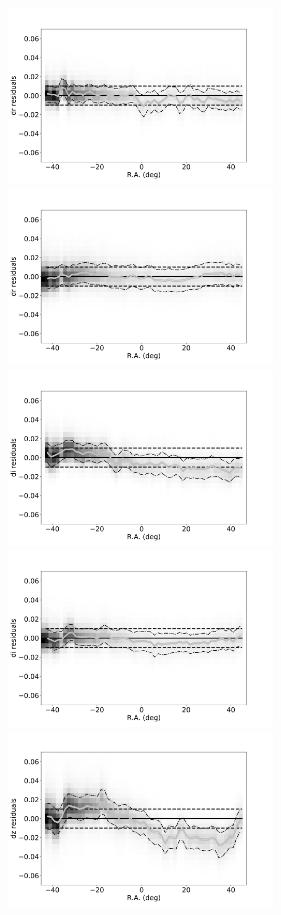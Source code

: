 \begin{figure}
    \centering\includegraphics[width=7cm]{figures/colorResidDES2bright_dr_RA_Hess.png}
    \centering\includegraphics[width=7cm]{figures/colorResidPSbright_dr_RA_Hess.png}
    \centering\includegraphics[width=7cm]{figures/colorResidDES2bright_di_RA_Hess.png}
    \centering\includegraphics[width=7cm]{figures/colorResidPSbright_di_RA_Hess.png}
    \centering\includegraphics[width=7cm]{figures/colorResidDES2bright_dz_RA_Hess.png}

\end{figure}
